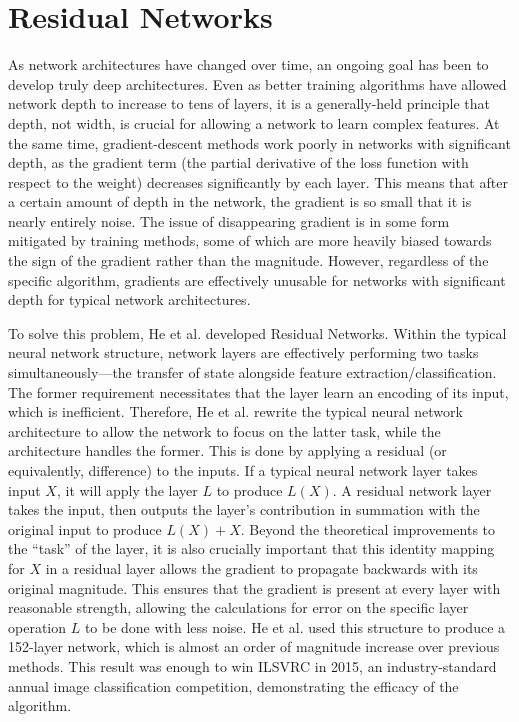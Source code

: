 \section{Residual Networks}
As network architectures have changed over time, an ongoing goal has been to develop truly deep architectures.
Even as better training algorithms have allowed network depth to increase to tens of layers, it is a generally-held principle that depth, not width, is crucial for allowing a network to learn complex features.
At the same time, gradient-descent methods work poorly in networks with significant depth, as the gradient term (the partial derivative of the loss function with respect to the weight) decreases significantly by each layer.
This means that after a certain amount of depth in the network, the gradient is so small that it is nearly entirely noise.
The issue of disappearing gradient is in some form mitigated by training methods, some of which are more heavily biased towards the sign of the gradient rather than the magnitude.
However, regardless of the specific algorithm, gradients are effectively unusable for networks with significant depth for typical network architectures.

To solve this problem, He et al. \cite{he2016deep} developed Residual Networks.
Within the typical neural network structure, network layers are effectively performing two tasks simultaneously---the transfer of state alongside feature extraction/classification.
The former requirement necessitates that the layer learn an encoding of its input, which is inefficient.
Therefore, He et al. rewrite the typical neural network architecture to allow the network to focus on the latter task, while the architecture handles the former. 
This is done by applying a residual (or equivalently, difference) to the inputs.
If a typical neural network layer takes input $X$, it will apply the layer $L$ to produce $L(X)$.
A residual network layer takes the input, then outputs the layer's contribution in summation with the original input to produce $L(X) + X$.
Beyond the theoretical improvements to the ``task'' of the layer, it is also crucially important that this identity mapping for $X$ in a residual layer allows the gradient to propagate backwards with its original magnitude.
This ensures that the gradient is present at every layer with reasonable strength, allowing the calculations for error on the specific layer operation $L$ to be done with less noise.
He et al. used this structure to produce a 152-layer network, which is almost an order of magnitude increase over previous methods. 
This result was enough to win ILSVRC in 2015, an industry-standard annual image classification competition, demonstrating the efficacy of the algorithm.

